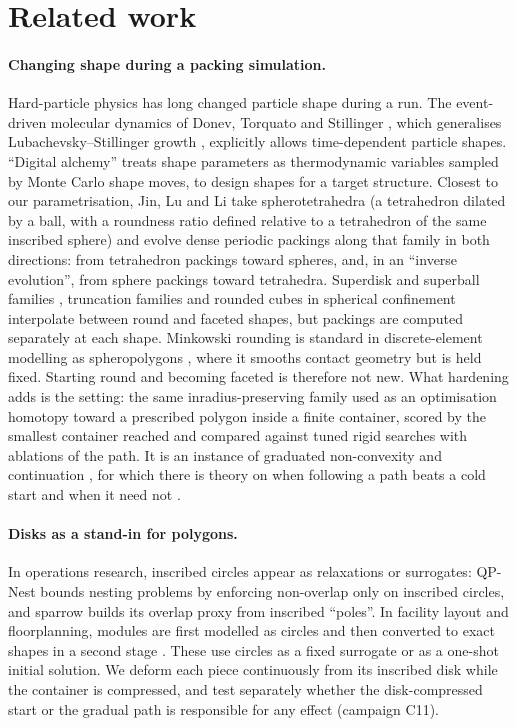 \section{Related work}\label{sec:related}
\paragraph{Changing shape during a packing simulation.} Hard-particle physics has long changed particle shape during a run. The event-driven molecular dynamics of Donev, Torquato and Stillinger \cite{Donev2005a}, which generalises Lubachevsky--Stillinger growth \cite{lubachevsky}, explicitly allows time-dependent particle shapes. ``Digital alchemy'' \cite{vanAnders2015,Geng2019} treats shape parameters as thermodynamic variables sampled by Monte Carlo shape moves, to design shapes for a target structure. Closest to our parametrisation, Jin, Lu and Li \cite{Jin2015} take spherotetrahedra (a tetrahedron dilated by a ball, with a roundness ratio defined relative to a tetrahedron of the same inscribed sphere) and evolve dense periodic packings along that family in both directions: from tetrahedron packings toward spheres, and, in an ``inverse evolution'', from sphere packings toward tetrahedra. Superdisk and superball families \cite{Jiao2008,Jiao2009}, truncation families \cite{Engel2012} and rounded cubes in spherical confinement \cite{Wang2018} interpolate between round and faceted shapes, but packings are computed separately at each shape. Minkowski rounding is standard in discrete-element modelling as spheropolygons \cite{AlonsoMarroquin2008,GalindoTorres2010}, where it smooths contact geometry but is held fixed. Starting round and becoming faceted is therefore not new. What hardening adds is the setting: the same inradius-preserving family used as an optimisation homotopy toward a prescribed polygon inside a finite container, scored by the smallest container reached and compared against tuned rigid searches with ablations of the path. It is an instance of graduated non-convexity and continuation \cite{blake,AllgowerGeorg1990}, for which there is theory on when following a path beats a cold start and when it need not \cite{Mobahi2015,Hazan2016}.

\paragraph{Disks as a stand-in for polygons.} In operations research, inscribed circles appear as relaxations or surrogates: QP-Nest \cite{Jones2014} bounds nesting problems by enforcing non-overlap only on inscribed circles, and sparrow \cite{Gardeyn2025} builds its overlap proxy from inscribed ``poles''. In facility layout and floorplanning, modules are first modelled as circles and then converted to exact shapes in a second stage \cite{AnjosVannelli2002,Luo2008}. These use circles as a fixed surrogate or as a one-shot initial solution. We deform each piece continuously from its inscribed disk while the container is compressed, and test separately whether the disk-compressed start or the gradual path is responsible for any effect (campaign C11).

